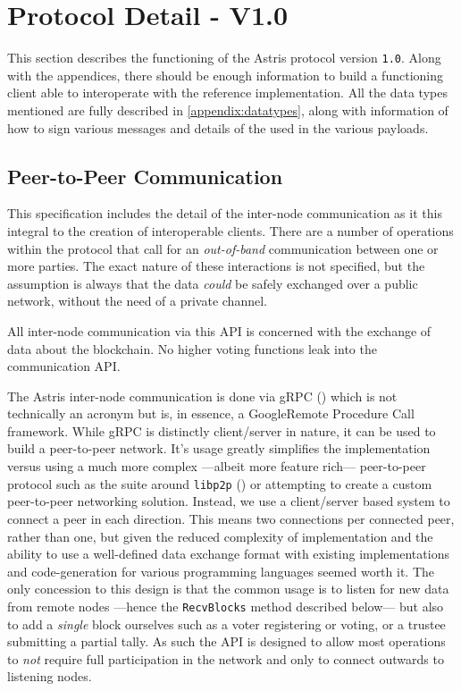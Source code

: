 \section{Protocol Detail - V1.0}
\label{ch:astris:detail}

This section describes the functioning of the Astris protocol version \texttt{1.0}. Along with the appendices, there should be enough information to build a functioning client able to interoperate with the reference implementation. All the data types mentioned are fully described in \autoref{appendix:datatypes}, along with information of how to sign various messages and details of the  used in the various payloads.

\subsection{Peer-to-Peer Communication}
\label{ch:astris:detail:p2p}

This specification includes the detail of the inter-node communication as it this integral to the creation of interoperable clients. There are a number of operations within the protocol that call for an \emph{out-of-band} communication between one or more parties. The exact nature of these interactions is not specified, but the assumption is always that the data \emph{could} be safely exchanged over a public network, without the need of a private channel.

All inter-node communication via this API is concerned with the exchange of data about the blockchain. No higher voting functions leak into the communication API.

The Astris inter-node communication is done via gRPC () which is not technically an acronym but is, in essence, a Google\texttrademark Remote Procedure Call framework. While gRPC is distinctly client/server in nature, it can be used to build a peer-to-peer network. It's usage greatly simplifies the implementation versus using a much more complex ---albeit more feature rich--- peer-to-peer protocol such as the suite around \texttt{libp2p} () or attempting to create a custom peer-to-peer networking solution. Instead, we use a client/server based system to connect a peer in each direction. This means two connections per connected peer, rather than one, but given the reduced complexity of implementation and the ability to use a well-defined data exchange format with existing implementations and code-generation for various programming languages seemed worth it. The only concession to this design is that the common usage is to listen for new data from remote nodes ---hence the \texttt{RecvBlocks} method described below--- but also to add a \emph{single} block ourselves such as a voter registering or voting, or a trustee submitting a partial tally. As such the API is designed to allow most operations to \emph{not} require full participation in the network and only to connect outwards to listening nodes.

